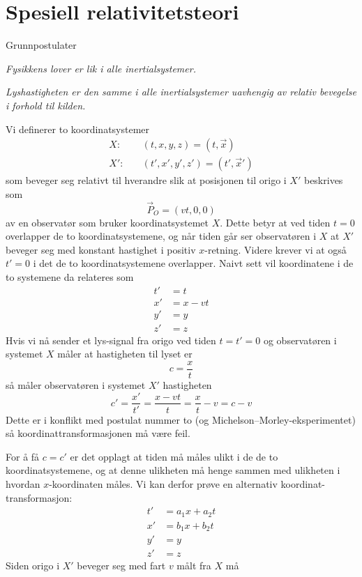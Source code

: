 \documentclass[a4paper,norsk,12pt]{article}
\begin{document}
\section*{Spesiell relativitetsteori}
Grunnpostulater
\begin{displayquote}
\emph{Fysikkens lover er lik i alle inertialsystemer.}
\end{displayquote}
\begin{displayquote}
\emph{Lyshastigheten er den samme i alle inertialsystemer uavhengig av relativ bevegelse i forhold til kilden.}
\end{displayquote}
Vi definerer to koordinatsystemer 
\begin{align*}
	X:&\quad (t,x,y,z) = (t,\vec{x})\\
	X':&\quad (t',x',y',z') = (t',\vec{x}')
\end{align*}
som beveger seg relativt til hverandre slik at posisjonen til origo i $X'$ beskrives som
\begin{displaymath}
	\vec{P}_O = (vt, 0, 0)
\end{displaymath}
av en observatør som bruker koordinatsystemet $X$. Dette betyr at ved tiden $t=0$ overlapper de to koordinatsystemene, og når tiden går ser observatøren i $X$ at $X'$ beveger seg med konstant hastighet i positiv $x$-retning. Videre krever vi at også $t'=0$ i det de to koordinatsystemene overlapper. Naivt sett vil koordinatene i de to systemene da relateres som 
\begin{align*}
	t' &= t \\
	x' &= x - vt\\
	y' &= y\\
	z' &= z
\end{align*}
Hvis vi nå sender et lys-signal fra origo ved tiden $t = t' = 0$ og observatøren i systemet $X$ måler at hastigheten til lyset er
\begin{displaymath}
	c = \frac{x}{t}
\end{displaymath}
så måler observatøren i systemet $X'$ hastigheten
\begin{displaymath}
	c' = \frac{x'}{t'} = \frac{x-vt}{t} = \frac{x}{t} - v = c - v
\end{displaymath}
Dette er i konflikt med postulat nummer to (og Michelson--Morley-eksperimentet) så koordinattransformasjonen må være feil.

For å få $c=c'$ er det opplagt at tiden må måles ulikt i de de to koordinatsystemene, og at denne ulikheten må henge sammen med ulikheten i hvordan $x$-koordinaten måles. Vi kan derfor prøve en alternativ koordinat-transformasjon:
\begin{align*}
	t' &= a_1x + a_2t \\
	x' &= b_1x + b_2t \\
	y' &= y \\
	z' &= z
\end{align*}
Siden origo i $X'$ beveger seg med fart $v$ målt fra $X$ må
\end{document}
